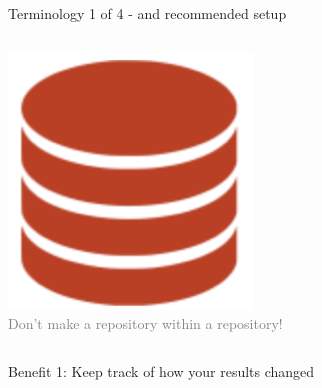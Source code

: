 \documentclass[ignorenonframetext, 10pt, aspectratio=169]{beamer}
\begin{document}
\begin{frame}{Terminology 1 of 4  - and recommended setup}
\begin{columns}[T]
\begin{column}{0.35\textwidth}
\bigskip
\bigskip
{}\includegraphics[width = 0.25\linewidth]{repo-0.png}\\

\flushright
\textcolor{gray}{\footnotesize Don't make a repository within a repository!}
\end{column}
\end{columns}
\end{frame}

\begin{frame}{Benefit 1: Keep track of how your results changed}
\begin{columns}[T]
\begin{column}{0.18\textwidth}


\end{column}
\end{columns}
\end{frame}
\end{document}
